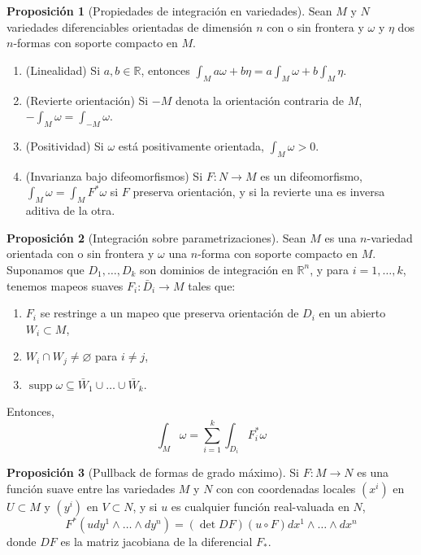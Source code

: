 \documentclass[spanish]{article}
\theoremstyle{definition}
\newtheorem*{prop}{Proposición}
\newcommand{\R}{\mathbb{R}}
\DeclareMathOperator{\supp}{supp}
\begin{document}
	\begin{prop}[Propiedades de integración en variedades]
		Sean $M$ y $N$ variedades diferenciables orientadas de dimensión $n$ con o sin frontera y $\omega$ y $\eta$ dos $n$-formas con soporte compacto en $M$.
		\begin{enumerate}
			\item (Linealidad) Si $a,b\in\R$, entonces $\int_Ma\omega+b\eta=a\int_M\omega+b\int_M\eta$.
			
			\item (Revierte orientación) Si $-M$ denota la orientación contraria de $M$, $-\int_M\omega=\int_{-M}\omega$.
			
			\item (Positividad) Si $\omega$ está positivamente orientada, $\int_M\omega>0$.
			
			\item (Invarianza bajo difeomorfismos) Si $F:N\to M$ es un difeomorfismo, $\int_M\omega=\int_M F^*\omega$ si $F$ preserva orientación, y si la revierte una es inversa aditiva de la otra.
		\end{enumerate}
	\end{prop}
	\begin{prop}[Integración sobre parametrizaciones]
		Sean $M$ es una $n$-variedad orientada con o sin frontera y $\omega$ una $n$-forma con soporte compacto en $M$. Suponamos que $D_1,\ldots,D_k$ son dominios de integración en $\R^n$, y para $i=1,\ldots,k$, tenemos mapeos suaves $F_i:\bar{D}_i\to M$ tales que:
		\begin{enumerate}
			\item $F_i$ se restringe a un mapeo que preserva orientación de $D_i$ en un abierto $W_i\subset M$,
			\item $W_i\cap W_j\neq\varnothing$ para $i\neq j$,
			\item $\supp \omega\subseteq\bar{W}_1\cup\ldots\cup\bar{W}_k$.
		\end{enumerate}
		Entonces,
		\[\int_M\omega=\sum_{i=1}^k\int_{D_i}F^*_i\omega\]
	\end{prop}
	\begin{prop}[Pullback de formas de grado máximo]
		Si $F:M\to N$ es una función suave entre las variedades $M$ y $N$ con con coordenadas locales $(x^i)$ en $U\subset M$ y $(y^i)$ en $V\subset N$, y si $u$ es cualquier función real-valuada en $N$,
		\[F^*(udy^1\wedge\ldots\wedge dy^n)=(\det DF)(u\circ F)dx^1\wedge\ldots\wedge dx^n\]
		donde $DF$ es la matriz jacobiana de la diferencial $F_*$.
	\end{prop}
	
\end{document}
